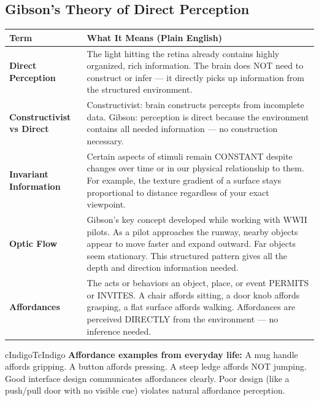 \documentclass[11pt,a4paper]{article}
\newcommand{\bb}[1]{\textbf{#1}}
\begin{document}
\subsection*{Gibson's Theory of Direct Perception}

\begin{center}
\renewcommand{\arraystretch}{1.4}
\begin{tabular}{|L{3.2cm}|L{12cm}|}
\hline
{}\color{white}\bb{Term} & \color{white}\bb{What It Means (Plain English)} \\
\hline
\bb{Direct Perception} & The light hitting the retina already contains highly organized, rich information. The brain does NOT need to construct or infer --- it directly picks up information from the structured environment. \\
\bb{Constructivist vs Direct} & Constructivist: brain constructs percepts from incomplete data. Gibson: perception is direct because the environment contains all needed information --- no construction necessary. \\
\bb{Invariant Information} & Certain aspects of stimuli remain CONSTANT despite changes over time or in our physical relationship to them. For example, the texture gradient of a surface stays proportional to distance regardless of your exact viewpoint. \\
\bb{Optic Flow} & Gibson's key concept developed while working with WWII pilots. As a pilot approaches the runway, nearby objects appear to move faster and expand outward. Far objects seem stationary. This structured pattern gives all the depth and direction information needed. \\
\bb{Affordances} & The acts or behaviors an object, place, or event PERMITS or INVITES. A chair affords sitting, a door knob affords grasping, a flat surface affords walking. Affordances are perceived DIRECTLY from the environment --- no inference needed. \\
\hline
\end{tabular}
\end{center}

\begin{hintbox}{cIndigoT}{cIndigo}
\bb{Affordance examples from everyday life:} A mug handle affords gripping. A button affords pressing. A steep ledge affords NOT jumping. Good interface design communicates affordances clearly. Poor design (like a push/pull door with no visible cue) violates natural affordance perception.
\end{hintbox}
\end{document}
